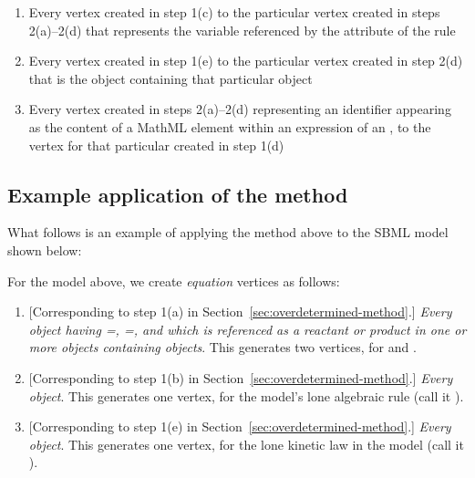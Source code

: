 \begin{enumerate}
\begin{enumerate}
  \item Every vertex created in step 1(c) to the particular vertex
    created in steps 2(a)--2(d) that represents the variable
    referenced by the  attribute of the rule
    
  \item Every vertex created in step 1(e) to the particular vertex
    created in step 2(d) that is the \Reaction object containing
    that particular \KineticLaw object
    
  \item Every vertex created in steps 2(a)--2(d) representing an
    identifier appearing as the content of a MathML 
    element within an expression of an \AlgebraicRule, to the
    vertex for that particular \AlgebraicRule created in step 1(d)
    
  \end{enumerate}

\end{enumerate}


\subsection*{Example application of the method}

What follows is an example of applying the method above to the
SBML model shown below:


For the model above, we create \emph{equation} vertices as
follows:
\begin{enumerate}\setlength{\parskip}{0.2ex}
  
\item{} [Corresponding to step 1(a) in
  Section~\ref{sec:overdetermined-method}.]  \emph{Every \Species
    object having =,
    =, and which is referenced as a
    reactant or product in one or more \Reaction objects
    containing \KineticLaw objects}.  This generates two vertices,
  for  and .
  
\item{} [Corresponding to step 1(b)
  in Section~\ref{sec:overdetermined-method}.] \emph{Every
    \AlgebraicRule object}.  This generates one vertex, for the
  model's lone algebraic rule (call it ).
  
\item{} [Corresponding to step 1(e)
  in Section~\ref{sec:overdetermined-method}.] \emph{Every \KineticLaw
    object}.  This generates one vertex, for the lone kinetic law
  in the model (call it ).

\end{enumerate}

